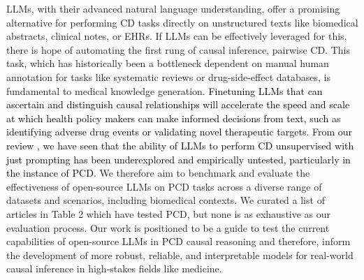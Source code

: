 \documentclass[conference]{IEEEtran}
\begin{document}
LLMs, with their advanced natural language understanding, offer a promising alternative for performing CD tasks directly on unstructured texts like biomedical abstracts, clinical notes, or EHRs. If LLMs can be effectively leveraged for this, there is hope of automating the first rung of causal inference, pairwise CD. This task, which has historically been a bottleneck dependent on manual human annotation for tasks like systematic reviews or drug-side-effect databases, is fundamental to medical knowledge generation. \textcolor{black}{Finetuning LLMs that can ascertain and distinguish causal relationships will accelerate the speed and scale at which health policy makers can make informed decisions from text, such as identifying adverse drug events or validating novel therapeutic targets.} \textcolor{black}{From our review \cite{wan2024large, wu2024causalitylargelanguagemodels}, we have seen that the ability of LLMs to perform CD unsupervised with just prompting has been underexplored and empirically untested, particularly in the instance of PCD.} We therefore aim to benchmark and evaluate the effectiveness of open-source LLMs on PCD tasks across a diverse range of datasets and scenarios, including biomedical contexts. We curated a list of articles in Table 2 which have tested PCD, but none is as exhaustive as our evaluation process. Our work is positioned to be a guide to test the current capabilities of open-source LLMs in PCD causal reasoning and therefore, inform the development of more robust, reliable, and interpretable models for real-world causal inference in high-stakes fields like medicine.





\end{document}
